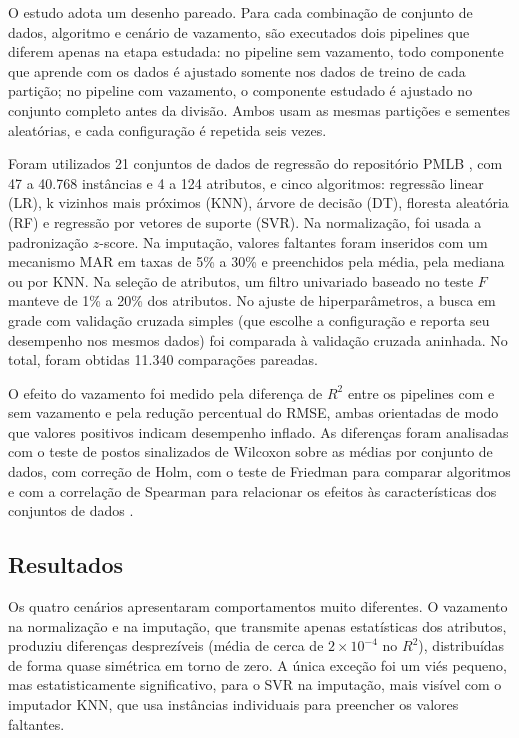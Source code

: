 \begin{otherlanguage}{brazilian}
O estudo adota um desenho pareado. Para cada combinação de conjunto de dados,
algoritmo e cenário de vazamento, são executados dois pipelines que diferem
apenas na etapa estudada: no pipeline sem vazamento, todo componente que aprende
com os dados é ajustado somente nos dados de treino de cada partição; no pipeline
com vazamento, o componente estudado é ajustado no conjunto completo antes da
divisão. Ambos usam as mesmas partições e sementes aleatórias, e cada
configuração é repetida seis vezes.

Foram utilizados 21 conjuntos de dados de regressão do repositório PMLB
\cite{romano2022}, com 47 a 40.768 instâncias e 4 a 124 atributos, e cinco
algoritmos: regressão linear (LR), k vizinhos mais próximos (KNN), árvore de
decisão (DT), floresta aleatória (RF) e regressão por vetores de suporte (SVR).
Na normalização, foi usada a padronização $z$-score. Na imputação, valores
faltantes foram inseridos com um mecanismo MAR \cite{muzellec2020} em taxas de
5\% a 30\% e preenchidos pela média, pela mediana ou por KNN. Na seleção de
atributos, um filtro univariado baseado no teste $F$ manteve de 1\% a 20\% dos
atributos. No ajuste de hiperparâmetros, a busca em grade com validação cruzada
simples (que escolhe a configuração e reporta seu desempenho nos mesmos dados)
foi comparada à validação cruzada aninhada. No total, foram obtidas 11.340
comparações pareadas.

O efeito do vazamento foi medido pela diferença de $R^2$ entre os pipelines com e
sem vazamento e pela redução percentual do RMSE, ambas orientadas de modo que
valores positivos indicam desempenho inflado. As diferenças foram analisadas com
o teste de postos sinalizados de Wilcoxon sobre as médias por conjunto de dados,
com correção de Holm, com o teste de Friedman para comparar algoritmos e com a
correlação de Spearman para relacionar os efeitos às características dos
conjuntos de dados \cite{demsar2006}.

\subsection*{Resultados}

Os quatro cenários apresentaram comportamentos muito diferentes. O vazamento na
normalização e na imputação, que transmite apenas estatísticas dos atributos,
produziu diferenças desprezíveis (média de cerca de $2\times10^{-4}$ no $R^2$),
distribuídas de forma quase simétrica em torno de zero. A única exceção foi um
viés pequeno, mas estatisticamente significativo, para o SVR na imputação, mais
visível com o imputador KNN, que usa instâncias individuais para preencher os
valores faltantes.


\end{otherlanguage}
